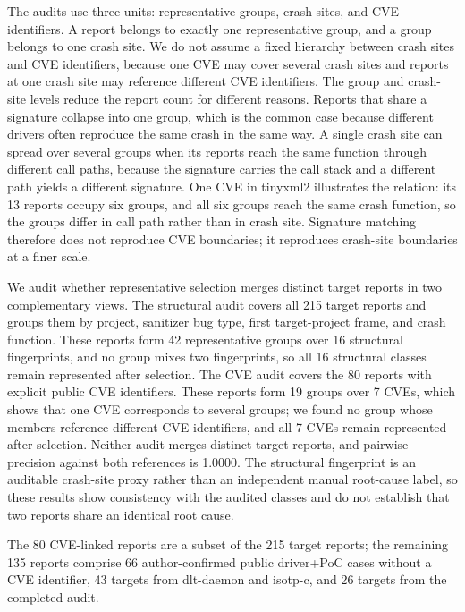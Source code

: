 \documentclass[pdflatex,sn-basic]{sn-jnl}%
\theoremstyle{thmstyleone}%
\theoremstyle{thmstyletwo}%
\theoremstyle{thmstylethree}%
\begin{document}
{\color{blue}
The audits use three units: representative groups, crash sites, and CVE identifiers. A report belongs to exactly one representative group, and a group belongs to one crash site. We do not assume a fixed hierarchy between crash sites and CVE identifiers, because one CVE may cover several crash sites and reports at one crash site may reference different CVE identifiers. The group and crash-site levels reduce the report count for different reasons. Reports that share a signature collapse into one group, which is the common case because different drivers often reproduce the same crash in the same way. A single crash site can spread over several groups when its reports reach the same function through different call paths, because the signature carries the call stack and a different path yields a different signature. One CVE in tinyxml2 illustrates the relation: its 13 reports occupy six groups, and all six groups reach the same crash function, so the groups differ in call path rather than in crash site. Signature matching therefore does not reproduce CVE boundaries; it reproduces crash-site boundaries at a finer scale.
}

{\color{blue}
We audit whether representative selection merges distinct target reports in two complementary views. The structural audit covers all 215 target reports and groups them by project, sanitizer bug type, first target-project frame, and crash function. These reports form 42 representative groups over 16 structural fingerprints, and no group mixes two fingerprints, so all 16 structural classes remain represented after selection. The CVE audit covers the 80 reports with explicit public CVE identifiers. These reports form 19 groups over 7 CVEs, which shows that one CVE corresponds to several groups; we found no group whose members reference different CVE identifiers, and all 7 CVEs remain represented after selection. Neither audit merges distinct target reports, and pairwise precision against both references is 1.0000. The structural fingerprint is an auditable crash-site proxy rather than an independent manual root-cause label, so these results show consistency with the audited classes and do not establish that two reports share an identical root cause.
}

{\color{blue}
The 80 CVE-linked reports are a subset of the 215 target reports; the remaining 135 reports comprise 66 author-confirmed public driver+PoC cases without a CVE identifier, 43 targets from dlt-daemon and isotp-c, and 26 targets from the completed audit.
}
\end{document}
